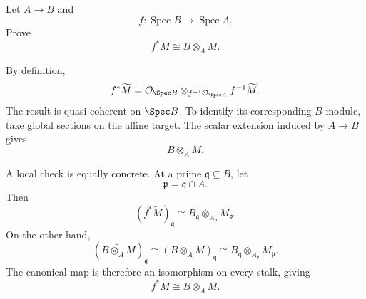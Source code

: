 \begin{problem}\label{prob:vi33-05}
Let \(A\to B\) and
\[
f:\operatorname{Spec}B\to\operatorname{Spec}A.
\]
Prove
\[
f^*\widetilde M\cong\widetilde{B\otimes_A M}.
\]
\end{problem}

\ifdefined\FullProblemDossiers
\begin{solution}
By definition,
\[
f^*\widetilde M
=
\mathcal O_{\Spec B}
\otimes_{f^{-1}\mathcal O_{\Spec A}}
f^{-1}\widetilde M.
\]
The result is quasi-coherent on \(\Spec B\). To identify its corresponding \(B\)-module, take global sections on
the affine target.  The scalar extension induced by \(A\to B\) gives
\[
B\otimes_A M.
\]

A local check is equally concrete.  At a prime \(\mathfrak q\subseteq B\), let
\[
\mathfrak p=\mathfrak q\cap A.
\]
Then
\[
(f^*\widetilde M)_{\mathfrak q}
\cong
B_{\mathfrak q}\otimes_{A_{\mathfrak p}}M_{\mathfrak p}.
\]
On the other hand,
\[
\left(\widetilde{B\otimes_A M}\right)_{\mathfrak q}
\cong
(B\otimes_A M)_{\mathfrak q}
\cong
B_{\mathfrak q}\otimes_{A_{\mathfrak p}}M_{\mathfrak p}.
\]
The canonical map is therefore an isomorphism on every stalk, giving
\[
\boxed{f^*\widetilde M\cong\widetilde{B\otimes_A M}}.
\]
\end{solution}
\fi
